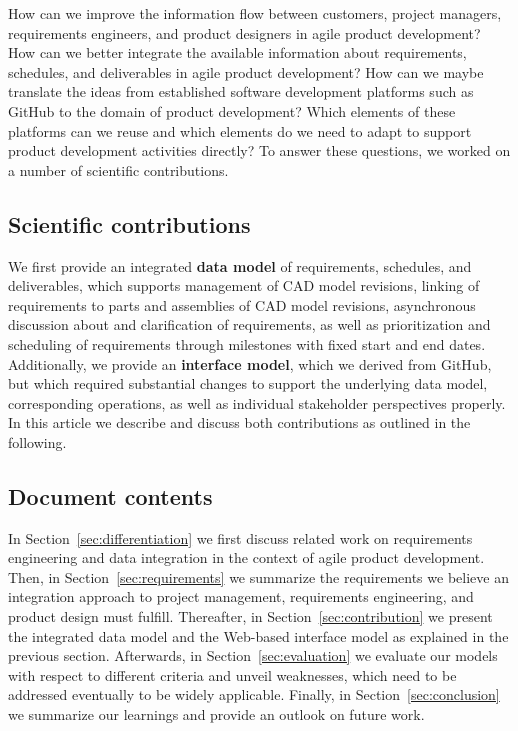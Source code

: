 How can we improve the information flow between customers, project managers, requirements engineers, and product designers in agile product development?
How can we better integrate the available information about requirements, schedules, and deliverables in agile product development?
How can we maybe translate the ideas from established software development platforms such as GitHub to the domain of product development?
Which elements of these platforms can we reuse and which elements do we need to adapt to support product development activities directly?
To answer these questions, we worked on a number of scientific contributions.

\subsection{Scientific contributions}

We first provide an integrated \textbf{data model} of requirements, schedules, and deliverables, which supports management of CAD model revisions, linking of requirements to parts and assemblies of CAD model revisions, asynchronous discussion about and clarification of requirements, as well as prioritization and scheduling of requirements through milestones with fixed start and end dates.
Additionally, we provide an \textbf{interface model}, which we derived from GitHub, but which required substantial changes to support the underlying data model, corresponding operations, as well as individual stakeholder perspectives properly.
In this article we describe and discuss both contributions as outlined in the following.

\subsection{Document contents}

In Section~\ref{sec:differentiation} we first discuss related work on requirements engineering and data integration in the context of agile product development.
Then, in Section~\ref{sec:requirements} we summarize the requirements we believe an integration approach to project management, requirements engineering, and product design must fulfill.
Thereafter, in Section~\ref{sec:contribution} we present the integrated data model and the Web-based interface model as explained in the previous section.
Afterwards, in Section~\ref{sec:evaluation} we evaluate our models with respect to different criteria and unveil weaknesses, which need to be addressed eventually to be widely applicable.
Finally, in Section~\ref{sec:conclusion} we summarize our learnings and provide an outlook on future work.